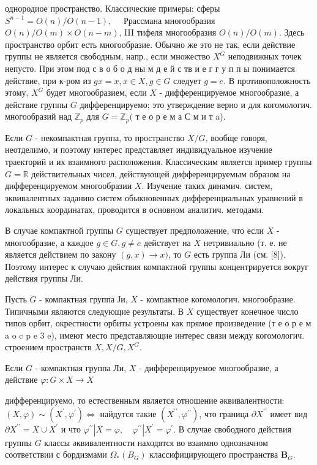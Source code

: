 \documentclass[10pt]{article}
\begin{document}
однородиое пространство. Классические примеры: сферы $S^{n-1}=O(n) / O(n-1), \quad$ Ррассмана многообразия $O(n) / O(m) \times O(n-m)$, III тифеля многообразия $O(n) / O(m)$. Здесь пространство орбит есть многообразие. Обычно же это не так, если действие группы не является свободным, напр., если множество $X^{G}$ неподвижных точек непусто. При этом под с в о б о д ны м д е й с тв и е г г у п п ы понимается действие, при к-ром из $g x=x, x \in X, g \in G$ следует $g=e$. В противоположность этому, $X^{G}$ будет многообразием, если $X$ - дифференцируемое многообразие, а действие группы $G$ дифференцируемо; это утверждение верно и для когомологич. многообразий над $\mathbb{Z}_{p}$ для $G=\mathbb{Z}_{p}($ т е о р е м а С м и т a).



Если $G$ - некомпактная группа, то пространство $X / G$, вообще говоря, неотделимо, и поэтому интерес представляет индивидуальное изучение траекторий и их взаимного расположения. Классическим является пример группы $G=\mathbb{R}$ действительных чисел, действующей дифференцируемым образом на дифференцируемом многообразии $X$. Изучение таких динамич. систем, эквивалентных заданию систем обыкновенных дифференциальных уравнений в локальных координатах, проводится в основном аналитич. методами.



В случае компактной группы $G$ существует предположение, что если $X$ - многообразие, а каждое $g \in G, g \neq e$ действует на $X$ нетривиально (т. е. не является действием по закону $(g, x) \rightarrow x)$, то $G$ есть группа Ли (см. [8]). Поэтому интерес к случаю действия компактной группы концентрируется вокруг действия группы Ли.



Пусть $G$ - компактная группа Ји, $X$ - компактное когомологич. многообразие. Типичными являются следующие результаты. В $X$ существует конечное число типов орбит, окрестности орбиты устроены как прямое произведение (т е о р е м a o c p e 3 e), имеют место представляющие интерес связи между когомологич. строением пространств $X, X / G, X^{G}$.



Если $G$ - компактная группа Ли, $X$ - дифференцируемое многообразие, а действие $\varphi: G \times X \rightarrow X$



дифференцируемо, то естественным является отношение әквивалентности: $(X, \varphi) \sim\left(X^{\prime}, \varphi^{\prime}\right) \Longleftrightarrow$ найдутся такие $\left(X^{\prime \prime}, \varphi^{\prime \prime}\right)$, что граница $\partial X^{\prime \prime}$ имеет вид $\partial X^{\prime \prime}=X \cup X^{\prime}$ и что $\varphi^{\prime \prime}\left|X=\varphi, \quad \varphi^{\prime \prime}\right| X^{\prime}=\varphi^{\prime}$. В случае свободного действия группы $G$ классы әквивалентности находятся во взаимно однозначном соответствии с бордизмами $\Omega_{*}\left(B_{G}\right)$ классифицирующего пространства $\boldsymbol{B}_{G}$.
\end{document}
